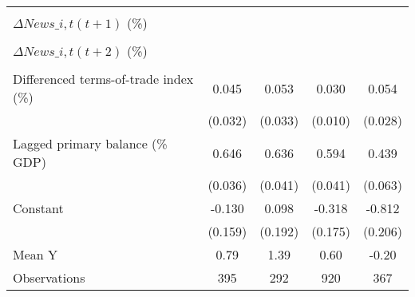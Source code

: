 {\begin{tabular}{l*{4}{c}}
                    &                     &                     &                     &                     \\
\addlinespace
$ \Delta News\_{i,t}(t+1)$ (\%)&                     &                     &                     &                     \\
                    &                     &                     &                     &                     \\
\addlinespace
$ \Delta News\_{i,t}(t+2)$ (\%)&                     &                     &                     &                     \\
                    &                     &                     &                     &                     \\
\addlinespace
Differenced terms-of-trade index (\%)&       0.045         &       0.053         &       0.030\sym{***}&       0.054\sym{*}  \\
                    &     (0.032)         &     (0.033)         &     (0.010)         &     (0.028)         \\
\addlinespace
Lagged primary balance (\% GDP)&       0.646\sym{***}&       0.636\sym{***}&       0.594\sym{***}&       0.439\sym{***}\\
                    &     (0.036)         &     (0.041)         &     (0.041)         &     (0.063)         \\
\addlinespace
Constant            &      -0.130         &       0.098         &      -0.318\sym{*}  &      -0.812\sym{***}\\
                    &     (0.159)         &     (0.192)         &     (0.175)         &     (0.206)         \\
\midrule
Mean Y              &        0.79         &        1.39         &        0.60         &       -0.20         \\
Observations        &         395         &         292         &         920         &         367         \\
\bottomrule
\end{tabular}
}
